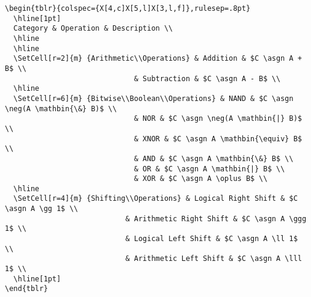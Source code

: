 \documentclass{beamer}
\newcommand*{\asgn}{\leftarrow}
\begin{document}
\begin{frame}
  \begin{lstlisting}
\begin{tblr}{colspec={X[4,c]X[5,l]X[3,l,f]},rulesep=.8pt}
  \hline[1pt]
  Category & Operation & Description \\
  \hline
  \hline
  \SetCell[r=2]{m} {Arithmetic\\Operations} & Addition & $C \asgn A + B$ \\
                              & Subtraction & $C \asgn A - B$ \\
  \hline
  \SetCell[r=6]{m} {Bitwise\\Boolean\\Operations} & NAND & $C \asgn \neg(A \mathbin{\&} B)$ \\
                              & NOR & $C \asgn \neg(A \mathbin{|} B)$ \\
                              & XNOR & $C \asgn A \mathbin{\equiv} B$ \\
                              & AND & $C \asgn A \mathbin{\&} B$ \\
                              & OR & $C \asgn A \mathbin{|} B$ \\
                              & XOR & $C \asgn A \oplus B$ \\
  \hline
  \SetCell[r=4]{m} {Shifting\\Operations} & Logical Right Shift & $C \asgn A \gg 1$ \\
                            & Arithmetic Right Shift & $C \asgn A \ggg 1$ \\
                            & Logical Left Shift & $C \asgn A \ll 1$ \\
                            & Arithmetic Left Shift & $C \asgn A \lll 1$ \\
  \hline[1pt]
\end{tblr}
  \end{lstlisting}
\end{frame}
\end{document}
